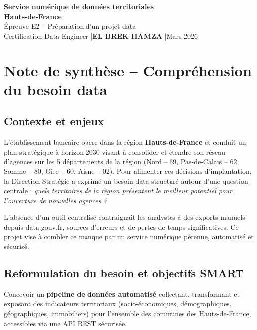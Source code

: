 \documentclass[11pt,a4paper]{article}
\begin{document}

\begin{center}
  \vspace*{0.5cm}
  {\Large \textbf{Service numérique de données territoriales\\Hauts-de-France}}\\[0.4cm]
  {\large Épreuve E2 -- Préparation d'un projet data}\\[0.3cm]
  {\normalsize Certification Data Engineer \quad|\quad \textbf{EL BREK HAMZA} \quad|\quad Mars 2026}
\end{center}

\vspace{0.4cm}
\tableofcontents
\newpage

\section{Note de synthèse -- Compréhension du besoin data}

\subsection{Contexte et enjeux}

L'établissement bancaire opère dans la région \textbf{Hauts-de-France} et conduit un plan stratégique
à horizon 2030 visant à consolider et étendre son réseau d'agences sur les 5 départements de la
région (Nord -- 59, Pas-de-Calais -- 62, Somme -- 80, Oise -- 60, Aisne -- 02). Pour alimenter ces
décisions d'implantation, la Direction Stratégie a exprimé un besoin data structuré autour d'une
question centrale : \textit{quels territoires de la région présentent le meilleur potentiel pour
l'ouverture de nouvelles agences ?}

L'absence d'un outil centralisé contraignait les analystes à des exports manuels depuis data.gouv.fr,
sources d'erreurs et de pertes de temps significatives. Ce projet vise à combler ce manque par un
service numérique pérenne, automatisé et sécurisé.

\subsection{Reformulation du besoin et objectifs SMART}

\begin{tcolorbox}[cadre, title={Besoin reformulé}]
Concevoir un \textbf{pipeline de données automatisé} collectant, transformant et exposant des
indicateurs territoriaux (socio-économiques, démographiques, géographiques, immobiliers)
pour l'ensemble des communes des Hauts-de-France, accessibles via une API REST sécurisée.
\end{tcolorbox}
\end{document}
